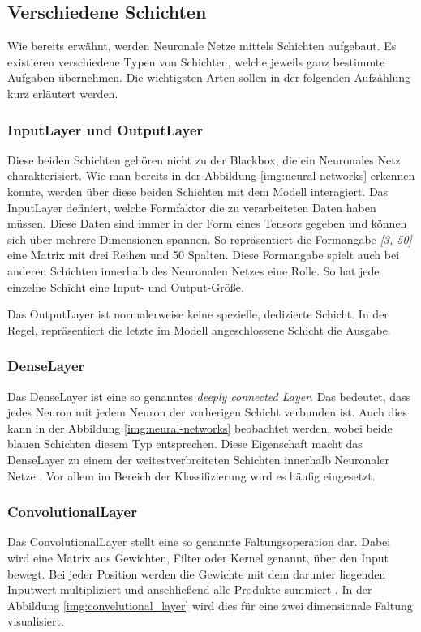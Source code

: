\subsection{Verschiedene Schichten}
Wie bereits erwähnt, werden Neuronale Netze mittels Schichten aufgebaut.
Es existieren verschiedene Typen von Schichten, welche jeweils ganz bestimmte Aufgaben übernehmen.
Die wichtigsten Arten sollen in der folgenden Aufzählung kurz erläutert werden.

\subsubsection{InputLayer und OutputLayer}
Diese beiden Schichten gehören nicht zu der Blackbox, die ein Neuronales Netz charakterisiert.
Wie man bereits in der Abbildung \ref{img:neural-networks} erkennen konnte, werden über diese beiden Schichten mit dem Modell interagiert.
Das InputLayer definiert, welche Formfaktor die zu verarbeiteten Daten haben müssen.
Diese Daten sind immer in der Form eines Tensors gegeben und können sich über mehrere Dimensionen spannen. 
So repräsentiert die Formangabe \textit{[3, 50]} eine Matrix mit drei Reihen und 50 Spalten.
Diese Formangabe spielt auch bei anderen Schichten innerhalb des Neuronalen Netzes eine Rolle.
So hat jede einzelne Schicht eine Input- und Output-Größe.
\newline

Das OutputLayer ist normalerweise keine spezielle, dedizierte Schicht.
In der Regel, repräsentiert die letzte im Modell angeschlossene Schicht die Ausgabe.

\subsubsection{DenseLayer}
Das DenseLayer ist eine so genanntes \textit{deeply connected Layer}.
Das bedeutet, dass jedes Neuron mit jedem Neuron der vorherigen Schicht verbunden ist.
Auch dies kann in der Abbildung \ref{img:neural-networks} beobachtet werden, wobei beide blauen Schichten diesem Typ entsprechen.
Diese Eigenschaft macht das DenseLayer zu einem der weitestverbreiteten Schichten innerhalb Neuronaler Netze \cite{dense-layer}.
Vor allem im Bereich der Klassifizierung wird es häufig eingesetzt.

\subsubsection{ConvolutionalLayer}
Das ConvolutionalLayer stellt eine so genannte Faltungsoperation dar.
Dabei wird eine Matrix aus Gewichten, Filter oder Kernel genannt, über den Input bewegt.
Bei jeder Position werden die Gewichte mit dem darunter liegenden Inputwert multipliziert und anschließend alle Produkte summiert \cite{convolutional_tut}.
In der Abbildung \ref{img:convelutional_layer} wird dies für eine zwei dimensionale Faltung visualisiert.

